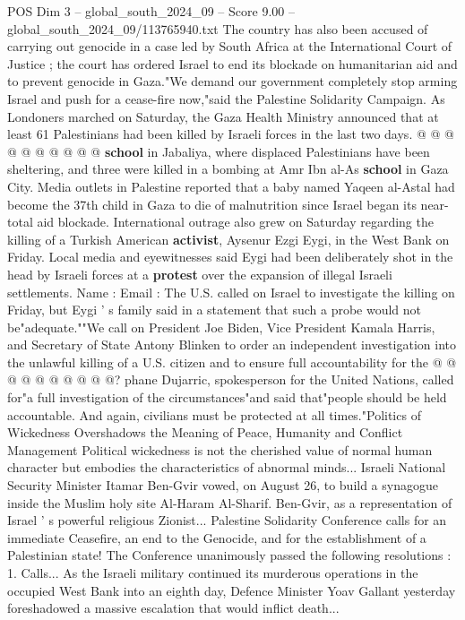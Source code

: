 \begin{textsample}{POS Dim 3 – global\_south\_2024\_09 – Score 9.00 – global\_south\_2024\_09/113765940.txt}
The country has also been accused of carrying out genocide in a case led by South Africa at the International Court of Justice ; the court has ordered Israel to end its blockade on humanitarian aid and to prevent genocide in Gaza."We demand our government completely stop arming Israel and push for a cease-fire now,"said the Palestine Solidarity Campaign.
As Londoners marched on Saturday, the Gaza Health Ministry announced that at least 61 Palestinians had been killed by Israeli forces in the last two days. @ @ @ @ @ @ @ @ @ @ \textbf{school} in Jabaliya, where displaced Palestinians have been sheltering, and three were killed in a bombing at Amr Ibn al-As \textbf{school} in Gaza City.
Media outlets in Palestine reported that a baby named Yaqeen al-Astal had become the 37th child in Gaza to die of malnutrition since Israel began its near-total aid blockade.
International outrage also grew on Saturday regarding the killing of a Turkish American \textbf{activist}, Aysenur Ezgi Eygi, in the West Bank on Friday.
Local media and eyewitnesses said Eygi had been deliberately shot in the head by Israeli forces at a \textbf{protest} over the expansion of illegal Israeli settlements.
Name : Email : The U.S. called on Israel to investigate the killing on Friday, but Eygi ' s family said in a statement that such a probe would not be"adequate.""We call on President Joe Biden, Vice President Kamala Harris, and Secretary of State Antony Blinken to order an independent investigation into the unlawful killing of a U.S. citizen and to ensure full accountability for the @ @ @ @ @ @ @ @ @ @? phane Dujarric, spokesperson for the United Nations, called for"a full investigation of the circumstances"and said that"people should be held accountable.
And again, civilians must be protected at all times."Politics of Wickedness Overshadows the Meaning of Peace, Humanity and Conflict Management Political wickedness is not the cherished value of normal human character but embodies the characteristics of abnormal minds...
Israeli National Security Minister Itamar Ben-Gvir vowed, on August 26, to build a synagogue inside the Muslim holy site Al-Haram Al-Sharif.
Ben-Gvir, as a representation of Israel ' s powerful religious Zionist...
Palestine Solidarity Conference calls for an immediate Ceasefire, an end to the Genocide, and for the establishment of a Palestinian state!
The Conference unanimously passed the following resolutions : 1.
Calls...
As the Israeli military continued its murderous operations in the occupied West Bank into an eighth day, Defence Minister Yoav Gallant yesterday foreshadowed a massive escalation that would inflict death...

\end{textsample}
